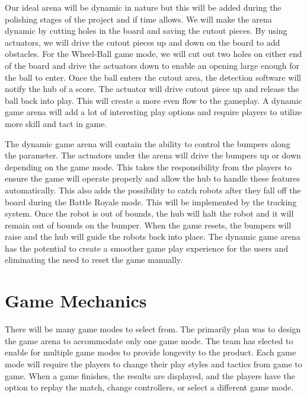 \documentclass[11pt]{ieeeconf}
\begin{document}
Our ideal arena will be dynamic in nature but this will be added during the polishing stages of the project and if time allows. We will make the arena dynamic by cutting holes in the board and saving the cutout pieces. By using actuators, we will drive the cutout pieces up and down on the board to add obstacles. For the Wheel-Ball game mode, we will cut out two holes on either end of the board and drive the actuators down to enable an opening large enough for the ball to enter. Once the ball enters the cutout area, the detection software will notify the hub of a score. The actuator will drive cutout piece up and release the ball back into play. This will create a more even flow to the gameplay. A dynamic game arena will add a lot of interesting play options and require players to utilize more skill and tact in game.

The dynamic game arena will contain the ability to control the bumpers along the parameter. The actuators under the arena will drive the bumpers up or down depending on the game mode. This takes the responsibility from the players to ensure the game will operate properly and allow the hub to handle these features automatically. This also adds the possibility to catch robots after they fall off the board during the Battle Royale mode. This will be implemented by the tracking system. Once the robot is out of bounds, the hub will halt the robot and it will remain out of bounds on the bumper. When the game resets, the bumpers will raise and the hub will guide the robots back into place. The dynamic game arena has the potential to create a smoother game play experience for the users and eliminating the need to reset the game manually. 

\section{Game Mechanics}

There will be many game modes to select from. The primarily plan was to design the game arena to accommodate only one game mode. The team has elected to enable for multiple game modes to provide longevity to the product. Each game mode will require the players to change their play styles and tactics from game to game. When a game finishes, the results are displayed, and the players have the option to replay the match, change controllers, or select a different game mode.
\end{document}
